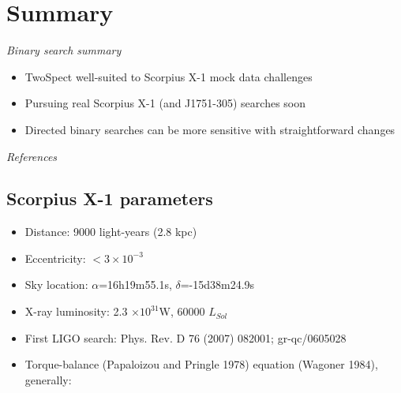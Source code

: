 \section{Summary}


\emph{Binary search summary}
\begin{itemize}
\item TwoSpect well-suited to Scorpius X-1 mock data challenges
\item Pursuing real Scorpius X-1 (and J1751-305) searches soon
\item Directed binary searches can be more sensitive with straightforward
changes
\end{itemize}







\emph{References}


\cite{Chakrabarty2003,GoetzThesis,GoetzTwoSpectMethods2011,PapaloizouPringle1978,Wagoner1984}


%
%





\subsection{Scorpius X-1 parameters}

\begin{itemize}
\item Distance: 9000 light-years (2.8 kpc)
\item Eccentricity: $<3\times10^{-3}$
\item Sky location: $\alpha$=16h19m55.1s, $\delta$=-15d38m24.9s
\item X-ray luminosity: 2.3 $\times10^{31}$W, 60000 $L_{Sol}$
\item First LIGO search: Phys. Rev. D 76 (2007) 082001; gr-qc/0605028
\item Torque-balance (Papaloizou and Pringle 1978) equation (Wagoner 1984),
generally:
\end{itemize}

